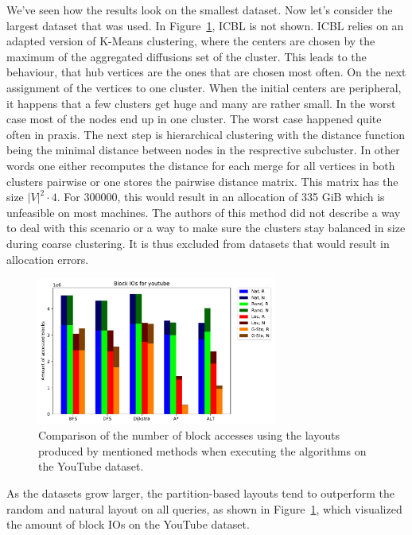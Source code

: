     We've seen how the results look on the smallest dataset. Now let's consider the largest dataset that was used.
    In Figure~\ref{yt-b}, ICBL is not shown.
    ICBL relies on an adapted version of K-Means clustering, where the centers are chosen by the maximum of the aggregated diffusions set of the cluster. 
    This leads to the behaviour, that hub vertices are the ones that are chosen most often. On the next assignment of the vertices to one cluster. When the initial centers are peripheral, it happens that a few clusters get huge and many are rather small. In the worst case most of the nodes end up in one cluster. The worst case happened quite often in praxis. The next step is hierarchical clustering with the distance function being the minimal distance between nodes in the resprective subcluster. In other words one either recomputes the distance for each merge for all vertices in both clusters pairwise or one stores the pairwise distance matrix.
    This matrix has the size $|V|^2 \cdot 4$. For $300000$, this would result in an allocation of 335 GiB which is unfeasible on most machines.
    The authors of this method did not describe a way to deal with this scenario or a way to make sure the clusters stay balanced in size during coarse clustering. It is thus excluded from datasets that would result in allocation errors.
    
    \begin{figure}[htp]
        \begin{center}
            \includegraphics[keepaspectratio,width=0.7\textwidth]{img/07-eval/youtube_Block_unsorted_io_comparison.pdf}
        \end{center}
        \caption{Comparison of the number of block accesses using the layouts produced by mentioned methods when executing the algorithms on the YouTube dataset.}
        \label{yt-b}
    \end{figure}
    
    
    As the datasets grow larger, the partition-based layouts tend to outperform the random and natural layout on all queries, as shown in Figure~\ref{yt-b}, which visualized the amount of block IOs on the YouTube dataset.    


